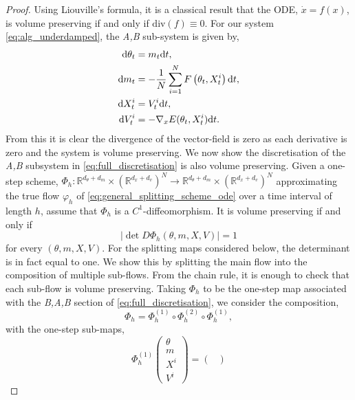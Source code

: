 \begin{proof}
Using Liouville's formula, it is a classical result that the ODE, $\dot{x}=f(x)$, is volume preserving if and only if $\mathrm{div}(f)\equiv0$. For our system \eqref{eq:alg_underdamped}, the \textit{A,B} sub-system is given by,
\begin{equation}\label{eq:general_splitting_scheme_ode}
\begin{aligned}
    \mathrm{d}\theta_t &=m_t\mathrm{d} t,\\
        \mathrm{d} m_t &= -\frac{1}{N}\sum_{i=1}^N{F}\left(\theta_t, X^i_t\right)\mathrm{d} t
        ,\\
        \mathrm{d} X^i_t&=V_t^i \mathrm{d} t,\\
        \mathrm{d} V^i_t&=-\nabla_x E(\theta_t, X^i_t)\mathrm{d} t.
\end{aligned}    
\end{equation}
From this it is clear the divergence of the vector-field is zero as each derivative is zero and the system is volume preserving. We now show the discretisation of the \textit{A,B} subsystem in \eqref{eq:full_discretisation} is also volume preserving. Given a one-step scheme, $\Phi_h:\mathbb{R}^{d_\theta+ d_m}\times(\mathbb{R}^ {d_x+ d_v})^N\rightarrow\mathbb{R}^{d_\theta+ d_m}\times(\mathbb{R}^ {d_x+ d_v})^N$ approximating the true flow $\varphi_h$ of \eqref{eq:general_splitting_scheme_ode} over a time interval of length $h$, assume that \(\Phi_h\) is a \(C^1\)-diffeomorphism. It is volume preserving if and only if
\begin{equation*}
    \left|\det D\Phi_h(\theta,m,X,V)\right|=1
\end{equation*}
for every \((\theta,m,X,V)\). For the splitting maps considered below,
the determinant is in fact equal to one. We show this by splitting the main flow into the composition of multiple sub-flows. From the chain rule, it is enough to check that each sub-flow is volume preserving. Taking $\Phi_h$ to be the one-step map associated with the \textit{B,A,B} section of \eqref{eq:full_discretisation}, we consider the composition,
\begin{equation*}
    \Phi_h=\Phi_h^{(1)}\circ \Phi_h^{(2)}\circ\Phi_h^{(1)},
\end{equation*}
with the one-step sub-maps,
\begin{equation*}
    \Phi_h^{(1)}\begin{pmatrix}\theta\\m\\X^i\\V^i
    \end{pmatrix}=\begin{pmatrix}

\end{pmatrix}
\end{equation*}
\end{proof}
